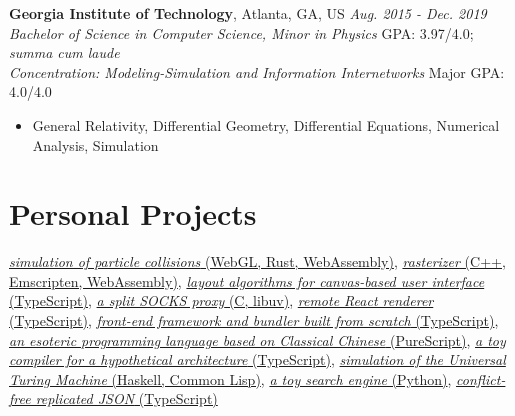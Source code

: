 \documentclass[12pt]{article}
\begin{document}
\vspace{1em}
\textbf{Georgia Institute of Technology}, Atlanta, GA, US \hfill \textit{Aug. 2015 - Dec. 2019}\\
\textit{Bachelor of Science in Computer Science, Minor in Physics} \hfill GPA: 3.97/4.0; \textit{summa cum laude}\\
\textit{Concentration: Modeling-Simulation and Information Internetworks} \hfill Major GPA: 4.0/4.0
\begin{itemize}
\item General Relativity, Differential Geometry, Differential Equations, Numerical Analysis, Simulation
\end{itemize}

\section*{Personal Projects}

\href{https://github.com/galmungral/particle-simulation}{\textit{simulation of particle collisions} (WebGL, Rust, WebAssembly)},
\href{https://github.com/galmungral/rasterizer}{\textit{rasterizer} (C++, Emscripten, WebAssembly)},
\href{https://github.com/galmungral/michelangelo}{\textit{layout algorithms for canvas-based user interface} (TypeScript)},
\href{https://github.com/galmungral/telescope}{\textit{a split SOCKS proxy} (C, libuv)}, 
\href{https://github.com/galmungral/react-teletype}{\textit{remote React renderer} (TypeScript)},
\href{https://github.com/galmungral/replay}{\textit{front-end framework and bundler built from scratch} (TypeScript)},
\href{https://github.com/galmungral/hanbun-lang}{\textit{an esoteric programming language based on Classical Chinese} (PureScript)},
\href{https://github.com/galmungral/sketchpad}{\textit{a toy compiler for a hypothetical architecture} (TypeScript)},
\href{https://github.com/galmungral/turing-machine}{\textit{simulation of the Universal Turing Machine} (Haskell, Common Lisp)},
\href{https://github.com/galmungral/plato}{\textit{a toy search engine} (Python)},
\href{https://github.com/galmungral/json-crdt}{\textit{conflict-free replicated JSON} (TypeScript)}
\end{document}
